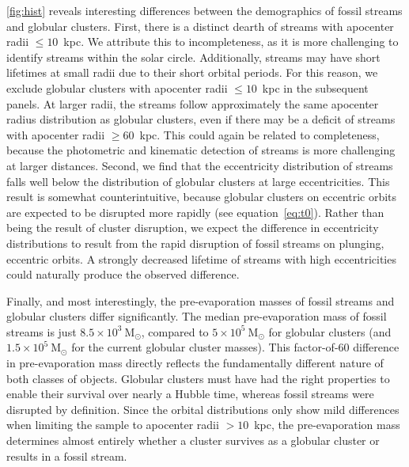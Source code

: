 \documentclass[twocolumn]{aastex63}
\newcommand{\msun}{\ensuremath{\textrm{M}_\odot}}
\begin{document}
\autoref{fig:hist} reveals interesting differences between the demographics of fossil streams and globular clusters. First, there is a distinct dearth of streams with apocenter radii $\leq10$~kpc. We attribute this to incompleteness, as it is more challenging to identify streams within the solar circle. Additionally, streams may have short lifetimes at small radii due to their short orbital periods. For this reason, we exclude globular clusters with apocenter radii $\leq10$~kpc in the subsequent panels. At larger radii, the streams follow approximately the same apocenter radius distribution as globular clusters, even if there may be a deficit of streams with apocenter radii $\geq60$~kpc. This could again be related to completeness, because the photometric and kinematic detection of streams is more challenging at larger distances. Second, we find that the eccentricity distribution of streams falls well below the distribution of globular clusters at large eccentricities. This result is somewhat counterintuitive, because globular clusters on eccentric orbits are expected to be disrupted more rapidly (see equation~\ref{eq:t0}). Rather than being the result of cluster disruption, we expect the difference in eccentricity distributions to result from the rapid disruption of fossil streams on plunging, eccentric orbits. A strongly decreased lifetime of streams with high eccentricities could naturally produce the observed difference.

Finally, and most interestingly, the pre-evaporation masses of fossil streams and globular clusters differ significantly. The median pre-evaporation mass of fossil streams is just $8.5\times10^3~\msun$, compared to $5\times10^5~\msun$ for globular clusters (and $1.5\times10^5~\msun$ for the current globular cluster masses). This factor-of-60 difference in pre-evaporation mass directly reflects the fundamentally different nature of both classes of objects. Globular clusters must have had the right properties to enable their survival over nearly a Hubble time, whereas fossil streams were disrupted by definition. Since the orbital distributions only show mild differences when limiting the sample to apocenter radii $>10$~kpc, the pre-evaporation mass determines almost entirely whether a cluster survives as a globular cluster or results in a fossil stream.
\end{document}
